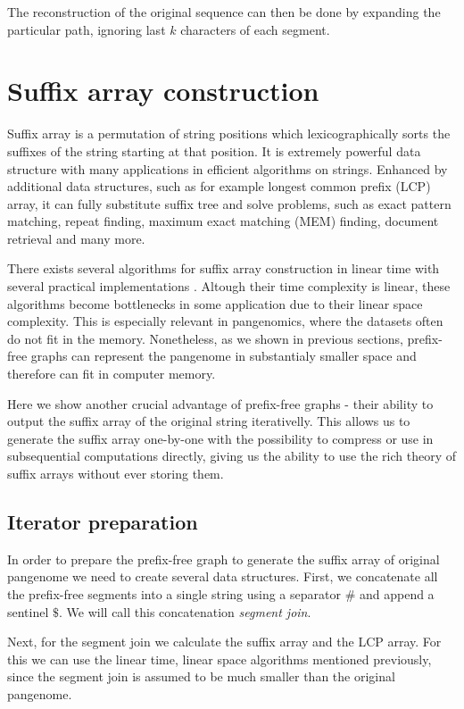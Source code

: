 \documentclass[twocolumn]{ceurart}
\begin{document}
The reconstruction of the original sequence can then be done by expanding 
the particular path, ignoring last $k$ characters of each segment.

\section{Suffix array construction}
Suffix array is a permutation of string positions which lexicographically
sorts the suffixes of the string starting at that position.
It is extremely powerful data structure with many applications in efficient
algorithms on strings.
Enhanced by additional data structures, such as for example longest common
prefix (LCP) array, it can fully substitute suffix tree and solve problems,
such as exact pattern matching, repeat finding, maximum exact matching (MEM)
finding, document retrieval and many more.

There exists several algorithms for suffix array construction in linear time
\cite{} with several practical implementations \cite{}.
Altough their time complexity is linear, these algorithms become bottlenecks in
some application due to their linear space complexity.
This is especially relevant in pangenomics, where the datasets often do not fit
in the memory.
Nonetheless, as we shown in previous sections, prefix-free graphs can represent
the pangenome in substantialy smaller space and therefore can fit in computer
memory.

Here we show another crucial advantage of prefix-free graphs - their ability to
output the suffix array of the original string iterativelly.
This allows us to generate the suffix array one-by-one with the possibility
to compress or use in subsequential computations directly, giving us the ability
to use the rich theory of suffix arrays without ever storing them.

\subsection{Iterator preparation}
In order to prepare the prefix-free graph to generate the suffix array of
original pangenome we need to create several data structures.
First, we concatenate all the prefix-free segments into a single string using
a separator $\#$ and append a sentinel $\$$.
We will call this concatenation \emph{segment join}.

Next, for the segment join we calculate the suffix array and the LCP array.
For this we can use the linear time, linear space algorithms mentioned previously,
since the segment join is assumed to be much smaller than the original pangenome.
\end{document}
